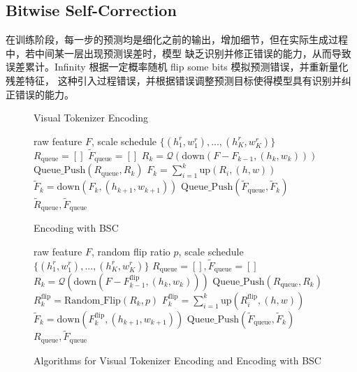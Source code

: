 \subsection{Bitwise Self-Correction}
在训练阶段，每一步的预测均是细化之前的输出，增加细节，但在实际生成过程中，若中间某一层出现预测误差时，模型
缺乏识别并修正错误的能力，从而导致误差累计。Infinity 根据一定概率随机 flip some bits 模拟预测错误，并重新量化残差特征，
这种引入过程错误，并根据错误调整预测目标使得模型具有识别并纠正错误的能力。

\begin{figure}[htbp]
    \centering
    \begin{minipage}{0.45\textwidth}
        \centering
        \begin{algorithm}[H]
            \caption{Visual Tokenizer Encoding}
            \begin{algorithmic}[1]
                \Require raw feature $F$, scale schedule $\{(h_1^r, w_1^r), ..., (h_K^r, w_K^r)\}$
                \State $R_{\text{queue}} = []$ 
                \State $\tilde{F}_{\text{queue}} = []$ 
                    \State $R_k = \mathcal{Q}(\text{down}(F - F_{k-1}, (h_k, w_k)))$
                    \State $\text{Queue\_Push}(R_{\text{queue}}, R_k)$
                    \State $F_k = \sum_{i=1}^{k} \text{up}(R_i, (h, w))$
                    \State $\tilde{F}_k = \text{down}(F_k, (h_{k+1}, w_{k+1}))$
                    \State $\text{Queue\_Push}(\tilde{F}_{\text{queue}}, \tilde{F}_k)$
                \EndFor
                \Ensure $\tilde{R}_{\text{queue}}, \tilde{F}_{\text{queue}}$
            \end{algorithmic}
        \end{algorithm}
    \end{minipage}\hfill
    \begin{minipage}{0.45\textwidth}
        \centering
        \begin{algorithm}[H]
            \caption{Encoding with BSC}
            \begin{algorithmic}[1]
                \Require raw feature $F$, random flip ratio $p$, scale schedule $\{(h_1^r, w_1^r), ..., (h_K^r, w_K^r)\}$
                \State $R_{\text{queue}} = [], \tilde{F}_{\text{queue}} = []$
                    \State $R_k = \mathcal{Q}(\text{down}(F - F_{k-1}^{\text{flip}}, (h_k, w_k)))$
                    \State $\text{Queue\_Push}(R_{\text{queue}}, R_k)$
                    \State $R_k^{\text{flip}} = \text{Random\_Flip}(R_k, p)$
                    \State $F_k^{\text{flip}} = \sum_{i=1}^{k} \text{up}(R_i^{\text{flip}}, (h, w))$
                    \State $\tilde{F}_k = \text{down}(F_k^{\text{flip}}, (h_{k+1}, w_{k+1}))$
                    \State $\text{Queue\_Push}(\tilde{F}_{\text{queue}}, \tilde{F}_k)$
                \EndFor
                \Ensure $R_{\text{queue}}, \tilde{F}_{\text{queue}}$
            \end{algorithmic}
        \end{algorithm}
    \end{minipage}
    \caption{Algorithms for Visual Tokenizer Encoding and Encoding with BSC}
\end{figure}